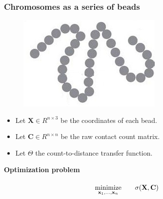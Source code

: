 \documentclass[xcolor=dvipsnames]{beamer}
\begin{document}
\begin{frame}
\frametitle{Chromosomes as a series of beads}

\begin{figure}
\includegraphics[width=0.25\linewidth]{figures/chrom_as_series_beads.jpg}
\end{figure}

\begin{itemize}[label={$\bullet$}]

\item Let $\mathbf{X} \in R^{n \times 3}$ be the coordinates of each bead.
\item Let $\mathbf{C} \in R^{n \times n}$ be the raw contact count matrix.
\item Let $\Theta$ the count-to-distance transfer function.
\end{itemize}

\vspace{2em}
{\color{Blue} \bf Optimization problem}
\begin{equation*}
\renewcommand{\arraystretch}{2}
\begin{array}{ccll}
\underset{{\bf x}_1,\ldots,{\bf x}_n}{\text{minimize}} & &
\sigma(\mathbf{X}, \mathbf{C})\\

\end{array}
\end{equation*}
\end{frame}
\end{document}
